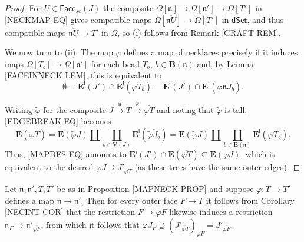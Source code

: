 \documentclass{hha}
\theoremstyle{definition} %
\begin{document}
\begin{proof}
	For $U \in \mathsf{Face}_{sc}(J)$
	the composite
	$\Omega[\mathfrak{n}] \to 
	\Omega[\mathfrak{n}'] \to 
	\Omega[T']$
	in \eqref{NECKMAP EQ}
	gives compatible maps
	$\Omega[\overline{\mathfrak{n} U}] \to \Omega[T']$
	in $\mathsf{dSet}$,
	and thus compatible maps
	$\overline{\mathfrak{n} U} \to T'$ 
	in $\Omega$,
	so (i) follows from 
	Remark \ref{GRAFT REM}.

	We now turn to (ii).
	The map $\varphi$ defines a map of necklaces 
	precisely if it induces maps
	$\Omega[T_b] \to \Omega[\mathfrak{n}']$
	for each bead 
	$T_b$, $b \in \boldsymbol{B}(\mathfrak n)$
	and, by Lemma \ref{FACEINNECK LEM},
	this is equivalent to
	\begin{equation}\label{MAPDES EQ}
	\emptyset
	=
	\boldsymbol{E}^{\mathsf{i}}(J')
	\cap
	\boldsymbol{E}^{\mathsf{i}}(\overline{ \varphi T_b})
	=
	\boldsymbol{E}^{\mathsf{i}}(J')
	\cap
	\boldsymbol{E}^{\mathsf{i}}(\overline{ \varphi \mathfrak{n} J_b}).
	\end{equation}
	
	Writing $\tilde{\varphi}$ for the composite
	$
	J \xrightarrow{\mathfrak n} T 
	\xrightarrow{\varphi} \overline{\varphi T}
	$
	and noting that $\tilde{\varphi}$ is tall,
	\eqref{EDGEBREAK EQ} becomes 
	\begin{equation}\label{DECOMPPR EQ}
	\boldsymbol{E}(\overline{\varphi T})
	=
	\boldsymbol{E}(\tilde{\varphi} J)
	\amalg
	\coprod_{b \in \boldsymbol{V}(J)}
	\boldsymbol{E}^{\mathsf{i}}(\overline{\tilde{\varphi} J_b})
	=
	\boldsymbol{E}(\tilde{\varphi} J)
	\amalg
	\coprod_{b \in \boldsymbol{B}(\mathfrak n)}
	\boldsymbol{E}^{\mathsf{i}}(\overline{\varphi T_b}).
	\end{equation}
	Thus, \eqref{MAPDES EQ}
	amounts to
	$\boldsymbol{E}^{\mathsf{i}}(J') \cap 
	\boldsymbol{E}(\overline{\varphi T})
	\subseteq
	\boldsymbol{E}(\varphi J)$,
	which is equivalent to the desired
	$\varphi J \supseteq J'_{\overline{\varphi T}}$
	(as these trees have the same outer edges).
\end{proof}



\begin{remark}\label{NECKMAPCHAR REM}
	Let $\mathfrak{n},\mathfrak{n}',T,T'$ be as in
	Proposition \ref{MAPNECK PROP}
	and suppose 
	$\varphi \colon T \to T'$
	defines a map
	$\mathfrak{n} \to \mathfrak{n}'$.
	Then for every outer face $F \to T$
	it follows from 
	Corollary \ref{NECINT COR}
	that the restriction 
	$F \to \overline{\varphi F}$
	likewise induces a restriction
	$\mathfrak{n}_F \to \mathfrak{n}'_{\overline{\varphi F}}$,
	from which it follows that
	$\varphi J_F \supseteq 
	\left(J'_{\overline{\varphi T}}\right)_{\overline{\varphi F}}
	=
	J'_{\overline{\varphi F}}$.
\end{remark}
\end{document}
